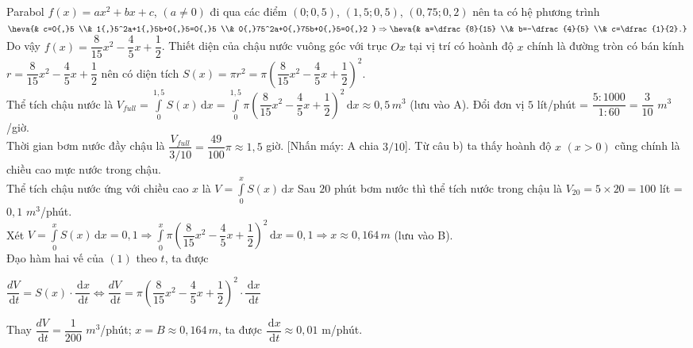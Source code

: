\begin{ex}
{\begin{center}
     \end{center}
     \begin{itemchoice}
         \itemch  Parabol $f(x)=ax^2+bx+c$, $\left(a\ne 0\right)$ đi qua các điểm $\left(0;0{,}5\right)$, $\left(1{,}5;0{,}5\right)$, $\left(0{,}75;0{,}2\right)$ nên ta có hệ phương trình $\heva{& c=0{,}5 \\& 1{,}5^2a+1{,}5b+0{,}5=0{,}5 \\& 0{,}75^2a+0{,}75b+0{,}5=0{,}2 } \Rightarrow \heva{& a=\dfrac{8}{15} \\& b=-\dfrac{4}{5} \\& c=\dfrac{1}{2}.} $\\
         Do vậy $f(x)=\dfrac{8}{15}x^2-\dfrac{4}{5}x+\dfrac{1}{2}$.
         \itemch Thiết diện của chậu nước vuông góc với trục $Ox$ tại vị trí có hoành độ $x$ chính là đường tròn có bán kính $r=\dfrac{8}{15}x^2-\dfrac{4}{5}x+\dfrac{1}{2}$ nên có diện tích $S(x)=\pi r^2=\pi \left(\dfrac{8}{15}x^2-\dfrac{4}{5}x+\dfrac{1}{2}\right)^2$.\\
         Thể tích chậu nước là $V_{full}=\int\limits_0^{1{,}5}{S(x)\mathrm{\,d}x}=\int\limits_0^{1{,}5}\pi {\left(\dfrac{8}{15}x^2-\dfrac{4}{5}x+\dfrac{1}{2}\right)^2\mathrm{\,d}x}\approx 0{,}5\,m^3$ (lưu vào A).
         \itemch Đổi đơn vị $5$ lít/phút = $\dfrac{5\colon 1000}{1\colon 60}=\dfrac{3}{10}$ $m^3$/giờ.\\
         Thời gian bơm nước đầy chậu là $\dfrac{V_{full}}{3/10}=\dfrac{49}{100}\pi \approx 1{,}5$ giờ.   [Nhấn máy: A chia $3/10$].
         \itemch Từ câu b) ta thấy hoành độ $x$ $\left(x>0\right)$ cũng chính là chiều cao mực nước trong chậu.\\
         Thể tích chậu nước ứng với chiều cao $x$ là $V=\int\limits_0^x{S(x)\mathrm{\,d}x}$ 
         Sau $20$ phút bơm nước thì thể tích nước trong chậu là $V_{20}=5\times 20=100$ lít = $0{,}1$ $m^3$/phút.\\
         Xét $V=\int\limits_0^x{S(x)\mathrm{\,d}x}=0{,}1\Rightarrow \int\limits_0^x{\pi \left(\dfrac{8}{15}x^2-\dfrac{4}{5}x+\dfrac{1}{2}\right)^2\mathrm{\,d}x}=0{,}1\Rightarrow x\approx 0{,}164\,m$ (lưu vào B).\\
         Đạo hàm hai vế của $(1)$ theo $t$, ta được\\
         \centerline{$\dfrac{dV}{\mathrm{\,d}t}=S(x)\cdot \dfrac{\mathrm{\,d}x}{\mathrm{\,d}t}\Leftrightarrow \dfrac{dV}{\mathrm{\,d}t}=\pi \left(\dfrac{8}{15}x^2-\dfrac{4}{5}x+\dfrac{1}{2}\right)^2\cdot \dfrac{\mathrm{\,d}x}{\mathrm{\,d}t}$}
         Thay $\dfrac{dV}{\mathrm{\,d}t}=\dfrac{1}{200}\,\,m^3$/phút; $x=B\approx 0{,}164\,m$, ta được $\dfrac{\mathrm{\,d}x}{\mathrm{\,d}t}\approx 0{,}01$ m/phút.
     \end{itemchoice}
 }
\end{ex}

